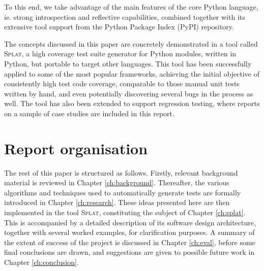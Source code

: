 To this end, we take advantage of the main features of the core Python language, ie. strong introspection and reflective capabilities, combined together with its extensive tool support from the Python Package Index (PyPI) repository.

The concepts discussed in this paper are concretely demonstrated in a tool called \textsc{Splat}, a high coverage test suite generator for Python modules, written in Python, but portable to target other languages. This tool has been successfully applied to some of the most popular frameworks, achieving the initial objective of consistently high test code coverage, comparable to those manual unit tests written by hand, and even potentially discovering several bugs in the process as well. The tool has also been extended to support regression testing, where reports on a sample of case studies are included in this report.

\section{Report organisation}
The rest of this paper is structured as follows. Firstly, relevant background material is reviewed in Chapter \ref{ch:background}. Thereafter, the various algorithms and techniques used to automatically generate tests are formally introduced in Chapter \ref{ch:research}. These ideas presented here are then implemented in the tool \textsc{Splat}, constituting the subject of Chapter \ref{ch:splat}. This is accompanied by a detailed description of its software design architecture, together with several worked examples, for clarification purposes. A summary of the extent of success of the project is discussed in Chapter \ref{ch:eval}, before some final conclusions are drawn, and suggestions are given to possible future work in Chapter \ref{ch:conclusion}.
